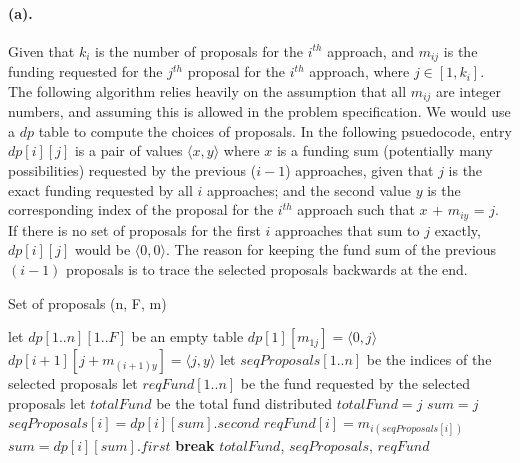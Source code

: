 \documentclass[12pt]{article}
\begin{document}
\paragraph{(a).} Given that \(k_i\) is the number of proposals for the \(i^{th}\) approach, and \(m_{ij}\) is the funding requested for the \(j^{th}\) proposal for the \(i^{th}\) approach, where \(j \in [1, k_i]\). The following algorithm relies heavily on the assumption that all \(m_{ij}\) are integer numbers, and assuming this is allowed in the problem specification. We would use a \(dp\) table to compute the choices of proposals. In the following psuedocode, entry \(dp[i][j]\) is a pair of values \(\langle x,y\rangle\) where \(x\) is a funding sum (potentially many possibilities) requested by the previous (\(i-1\)) approaches, given that \(j\) is the exact funding requested by all \(i\) approaches; and the second value \(y\) is the corresponding index of the proposal for the \(i^{th}\) approach such that \(x\) + \(m_{iy}\) = \(j\). If there is no set of proposals for the first \(i\) approaches that sum to \(j\) exactly, \(dp[i][j]\) would be \(\langle 0,0\rangle\). The reason for keeping the fund sum of the previous \((i-1)\) proposals is to trace the selected proposals backwards at the end.
\begin{algorithm}[H]
     \caption{Set of proposals (n, F, m)}
     \begin{algorithmic}[1]
          \State let \(dp[1..n][1..F]\) be an empty table 
               \State \(dp[1][m_{1j}] = \langle 0,j \rangle\) 
          \EndFor
                                   \State \(dp[i+1][j+m_{(i+1)y}] = \langle j,y \rangle\)
                              \EndIf
                         \EndFor
                    \EndIf
               \EndFor
          \EndFor
          \State let \(seqProposals[1..n]\) be the indices of the selected proposals
          \State let \(reqFund[1..n]\) be the fund requested by the selected proposals
          \State let \(totalFund\) be the total fund distributed
                
                    \State \(totalFund = j\)
                    \State \(sum = j\)
                     
                         \State \(seqProposals[i] = dp[i][sum].second\)
                         \State \(reqFund[i] = m_{i(seqProposals[i])}\)
                         \State \(sum = dp[i][sum].first\)
                    \EndFor
                    \State \textbf{break}
               \EndIf
          \EndFor
          \State \Return \(totalFund\), \(seqProposals\), \(reqFund\)
     \end{algorithmic}
\end{algorithm}
\end{document}
